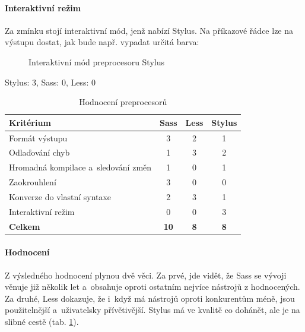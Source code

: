 \documentclass[thesis=B,czech]{FITthesis}[2012/06/26]
\begin{document}
\paragraph{Interaktivní režim}

 Za zmínku stojí interaktivní mód, jenž nabízí Stylus. Na příkazové řádce lze na výstupu dostat, jak bude např. vypadat určitá barva:
\begin{figure}[h]
	\begin{center}
	\end{center}
	\caption{Interaktivní mód preprocesoru Stylus}
	\label{imgStyl2}
\end{figure}

Stylus: 3, Sass: 0, Less: 0



\begin{table}\centering
 	\caption[Hodnocení preprocesorů]{Hodnocení preprocesorů}\label{tab:pre}
 	\begin{tabular}{|l|c|c|c|}\hline
	\textbf{Kritérium} & \textbf{Sass} & \textbf{Less} & \textbf{Stylus} \tabularnewline	
 	\hline\hline
		 Formát výstupu & 3 & 2 & 1\tabularnewline\hline
		 Odlaďování chyb & 1 & 3 & 2\tabularnewline\hline
		 Hromadná kompilace a~sledování změn & 1 & 0 & 1\tabularnewline\hline
		 Zaokrouhlení & 3 & 0 & 0\tabularnewline\hline
		 Konverze do vlastní syntaxe & 2 & 3 & 1\tabularnewline\hline
		 Interaktivní režim  & 0 & 0 & 3\tabularnewline\hline
		 \textbf{Celkem} & \textbf{10} & \textbf{8} & \textbf{8}\tabularnewline\hline
 	\end{tabular}
\end{table} 


\paragraph{Hodnocení}

Z výsledného hodnocení plynou dvě věci. Za prvé, jde vidět, že Sass se vývoji věnuje již několik let a~obsahuje oproti ostatním nejvíce nástrojů z hodnocených. Za druhé, Less dokazuje, že i~když má nástrojů oproti konkurentům méně, jsou použitelnější a~uživatelsky přívětivější. Stylus má ve kvalitě co dohánět, ale je na slibné cestě (tab. \ref{tab:pre}).
\end{document}

